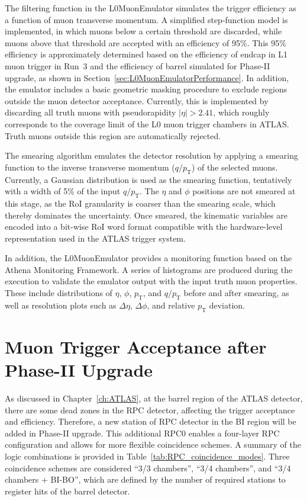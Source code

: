 The filtering function in the L0MuonEmulator simulates the trigger efficiency as a function of muon transverse momentum. A simplified step-function model is implemented, in which muons below a certain threshold are discarded, while muons above that threshold are accepted with an efficiency of 95\%. This 95\% efficiency is approximately determined based on the efficiency of endcap in L1 muon trigger in Run~3 and the efficiency of barrel simulated for Phase-II upgrade, as shown in Section~\ref{sec:L0MuonEmulatorPerformance}. In addition, the emulator includes a basic geometric masking procedure to exclude regions outside the muon detector acceptance. Currently, this is implemented by discarding all truth muons with pseudorapidity $|\eta| > 2.41$, which roughly corresponds to the coverage limit of the L0 muon trigger chambers in ATLAS. Truth muons outside this region are automatically rejected.

The smearing algorithm emulates the detector resolution by applying a smearing function to the inverse transverse momentum ($q/p_\mathrm{T}$) of the selected muons. Currently, a Gaussian distribution is used as the smearing function, tentatively with a width of 5\% of the input $q/p_\mathrm{T}$. The $\eta$ and $\phi$ positions are not smeared at this stage, as the RoI granularity is coarser than the smearing scale, which thereby dominates the uncertainty. Once smeared, the kinematic variables are encoded into a bit-wise RoI word format compatible with the hardware-level representation used in the ATLAS trigger system.

In addition, the L0MuonEmulator provides a monitoring function based on the Athena Monitoring Framework. A series of histograms are produced during the execution to validate the emulator output with the input truth muon properties. These include distributions of $\eta$, $\phi$, $p_\mathrm{T}$, and $q/p_\mathrm{T}$ before and after smearing, as well as resolution plots such as $\Delta\eta$, $\Delta\phi$, and relative $p_\mathrm{T}$ deviation.

\section{Muon Trigger Acceptance after Phase-II Upgrade} \label{sec:MuonTriggerAcceptance}
As discussed in Chapter~\ref{ch:ATLAS}, at the barrel region of the ATLAS detector, there are some dead zones in the RPC detector, affecting the trigger acceptance and efficiency. Therefore, a new station of RPC detector in the BI region will be added in Phase-II upgrade. This additional RPC0 enables a four-layer RPC configuration and allows for more flexible coincidence schemes. A summary of the logic combinations is provided in Table~\ref{tab:RPC_coincidence_modes}. Three coincidence schemes are considered ``3/3 chambers'', ``3/4 chambers'', and ``3/4 chambers + BI-BO'', which are defined by the number of required stations to register hits of the barrel detector. 

